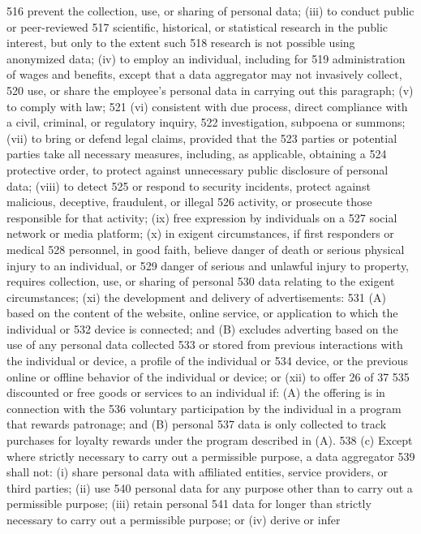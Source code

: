 516 prevent the collection, use, or sharing of personal data; (iii) to conduct public or peer-reviewed
517 scientific, historical, or statistical research in the public interest, but only to the extent such
518 research is not possible using anonymized data; (iv) to employ an individual, including for
519 administration of wages and benefits, except that a data aggregator may not invasively collect,
520 use, or share the employee’s personal data in carrying out this paragraph; (v) to comply with law;
521 (vi) consistent with due process, direct compliance with a civil, criminal, or regulatory inquiry,
522 investigation, subpoena or summons; (vii) to bring or defend legal claims, provided that the
523 parties or potential parties take all necessary measures, including, as applicable, obtaining a
524 protective order, to protect against unnecessary public disclosure of personal data; (viii) to detect
525 or respond to security incidents, protect against malicious, deceptive, fraudulent, or illegal
526 activity, or prosecute those responsible for that activity; (ix) free expression by individuals on a
527 social network or media platform; (x) in exigent circumstances, if first responders or medical
528 personnel, in good faith, believe danger of death or serious physical injury to an individual, or
529 danger of serious and unlawful injury to property, requires collection, use, or sharing of personal
530 data relating to the exigent circumstances; (xi) the development and delivery of advertisements:
531 (A) based on the content of the website, online service, or application to which the individual or
532 device is connected; and (B) excludes adverting based on the use of any personal data collected
533 or stored from previous interactions with the individual or device, a profile of the individual or
534 device, or the previous online or offline behavior of the individual or device; or (xii) to offer
26 of 37
535 discounted or free goods or services to an individual if: (A) the offering is in connection with the
536 voluntary participation by the individual in a program that rewards patronage; and (B) personal
537 data is only collected to track purchases for loyalty rewards under the program described in (A).
538 (c) Except where strictly necessary to carry out a permissible purpose, a data aggregator
539 shall not: (i) share personal data with affiliated entities, service providers, or third parties; (ii) use
540 personal data for any purpose other than to carry out a permissible purpose; (iii) retain personal
541 data for longer than strictly necessary to carry out a permissible purpose; or (iv) derive or infer
